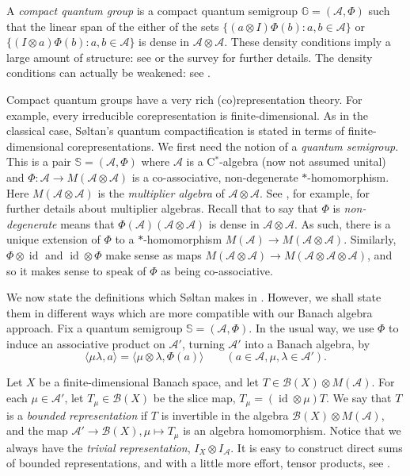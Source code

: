 \documentclass[twoside,a4paper]{article}
\theoremstyle{definition}
\theoremstyle{remark}
\newcommand{\mc}{\mathcal}
\newcommand{\id}{\operatorname{id}}
\newcommand{\ip}[2]{\langle{#1},{#2}\rangle}
\begin{document}
A \emph{compact quantum group} is a compact quantum semigroup $\mathbb G=(\mc A,\Phi)$
such that the linear span of the either of the sets
$\{(a\otimes I)\Phi(b) : a,b\in\mc A\}$ or $\{(I\otimes a)\Phi(b) : a,b\in\mc A\}$
is dense in $\mc A\otimes\mc A$.  These density conditions imply a large
amount of structure: see \cite{woro1} or the survey \cite{maes} for further
details. The density conditions can actually be weakened: see \cite{murphy}.

Compact quantum groups have a very rich (co)representation theory.  For example,
every irreducible corepresentation is finite-dimensional.  As in the classical case,
S{\o}ltan's quantum compactification is stated in terms of finite-dimensional
corepresentations.  We first need the notion of a \emph{quantum semigroup}.
This is a pair $\mathbb S=(\mc A,\Phi)$ where $\mc A$ is a C$^*$-algebra (now not
assumed unital) and $\Phi:\mc A\rightarrow M(\mc A\otimes\mc A)$ is a co-associative,
non-degenerate $*$-homomorphism.  Here $M(\mc A\otimes\mc A)$ is the \emph{multiplier
algebra} of $\mc A\otimes\mc A$.  See \cite{lance}, for example, for further details
about multiplier algebras.  Recall that to say that $\Phi$ is \emph{non-degenerate} means
that $\Phi(\mc A)(\mc A\otimes\mc A)$ is dense in $\mc A\otimes\mc A$.  As such, there
is a unique extension of $\Phi$ to a $*$-homomorphism $M(\mc A)\rightarrow M(\mc A\otimes
\mc A)$.  Similarly, $\Phi\otimes\id$ and $\id\otimes\Phi$ make sense as maps
$M(\mc A\otimes\mc A)\rightarrow M(\mc A\otimes\mc A\otimes\mc A)$, and so it
makes sense to speak of $\Phi$ as being co-associative.

We now state the definitions which S{\o}ltan makes in \cite{soltan}.
However, we shall state them in different ways which are more compatible with
our Banach algebra approach.  Fix a quantum semigroup $\mathbb S=(\mc A,\Phi)$.
In the usual way, we use $\Phi$ to induce an associative product on $\mc A'$,
turning $\mc A'$ into a Banach algebra, by
\[ \ip{\mu\lambda}{a} = \ip{\mu\otimes\lambda}{\Phi(a)}
\qquad (a\in\mc A, \mu,\lambda\in\mc A'). \]

Let $X$ be a finite-dimensional Banach space, and let $T\in\mc B(X)\otimes M(\mc A)$.
For each $\mu\in\mc A'$, let $T_\mu\in\mc B(X)$ be the slice map,
$T_\mu = (\id\otimes\mu)T$.  We say that $T$ is a \emph{bounded representation} if
$T$ is invertible in the algebra $\mc B(X)\otimes M(\mc A)$, and the map
$\mc A'\rightarrow\mc B(X), \mu\mapsto T_\mu$ is an algebra homomorphism.
Notice that we always have the \emph{trivial representation}, $I_X\otimes I_{\mc A}$.
It is easy to construct direct sums of bounded representations, and with a little
more effort, tensor products, see \cite[Section~2.1]{soltan}.
\end{document}
